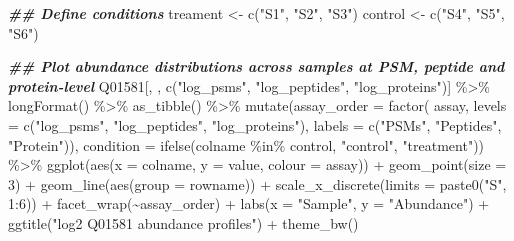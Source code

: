 \documentclass[9pt,a4paper,]{extarticle}
\newenvironment{Shaded}{\begin{snugshade}}{\end{snugshade}}
\newcommand{\AttributeTok}[1]{\textcolor[rgb]{0.77,0.63,0.00}{#1}}
\newcommand{\DecValTok}[1]{\textcolor[rgb]{0.00,0.00,0.81}{#1}}
\newcommand{\DocumentationTok}[1]{\textcolor[rgb]{0.56,0.35,0.01}{\textbf{\textit{#1}}}}
\newcommand{\FunctionTok}[1]{\textcolor[rgb]{0.00,0.00,0.00}{#1}}
\newcommand{\NormalTok}[1]{#1}
\newcommand{\OtherTok}[1]{\textcolor[rgb]{0.56,0.35,0.01}{#1}}
\newcommand{\SpecialCharTok}[1]{\textcolor[rgb]{0.00,0.00,0.00}{#1}}
\newcommand{\StringTok}[1]{\textcolor[rgb]{0.31,0.60,0.02}{#1}}
\begin{document}
\begin{Shaded}
\begin{Highlighting}[]
\DocumentationTok{\#\# Define conditions}
\NormalTok{treament }\OtherTok{\textless{}{-}} \FunctionTok{c}\NormalTok{(}\StringTok{"S1"}\NormalTok{, }\StringTok{"S2"}\NormalTok{, }\StringTok{"S3"}\NormalTok{)}
\NormalTok{control }\OtherTok{\textless{}{-}} \FunctionTok{c}\NormalTok{(}\StringTok{"S4"}\NormalTok{, }\StringTok{"S5"}\NormalTok{, }\StringTok{"S6"}\NormalTok{)}

\DocumentationTok{\#\# Plot abundance distributions across samples at PSM, peptide and protein{-}level}
\NormalTok{Q01581[, , }\FunctionTok{c}\NormalTok{(}\StringTok{"log\_psms"}\NormalTok{, }\StringTok{"log\_peptides"}\NormalTok{, }\StringTok{"log\_proteins"}\NormalTok{)] }\SpecialCharTok{\%\textgreater{}\%}
  \FunctionTok{longFormat}\NormalTok{() }\SpecialCharTok{\%\textgreater{}\%}
  \FunctionTok{as\_tibble}\NormalTok{() }\SpecialCharTok{\%\textgreater{}\%}
  \FunctionTok{mutate}\NormalTok{(}\AttributeTok{assay\_order =} \FunctionTok{factor}\NormalTok{(}
\NormalTok{    assay,}
    \AttributeTok{levels =} \FunctionTok{c}\NormalTok{(}\StringTok{"log\_psms"}\NormalTok{, }\StringTok{"log\_peptides"}\NormalTok{, }\StringTok{"log\_proteins"}\NormalTok{),}
    \AttributeTok{labels =} \FunctionTok{c}\NormalTok{(}\StringTok{"PSMs"}\NormalTok{, }\StringTok{"Peptides"}\NormalTok{, }\StringTok{"Protein"}\NormalTok{)),}
    \AttributeTok{condition =} \FunctionTok{ifelse}\NormalTok{(colname }\SpecialCharTok{\%in\%}\NormalTok{ control, }\StringTok{"control"}\NormalTok{, }\StringTok{"treatment"}\NormalTok{)) }\SpecialCharTok{\%\textgreater{}\%}
  \FunctionTok{ggplot}\NormalTok{(}\FunctionTok{aes}\NormalTok{(}\AttributeTok{x =}\NormalTok{ colname, }\AttributeTok{y =}\NormalTok{ value, }\AttributeTok{colour =}\NormalTok{ assay)) }\SpecialCharTok{+}
  \FunctionTok{geom\_point}\NormalTok{(}\AttributeTok{size =} \DecValTok{3}\NormalTok{) }\SpecialCharTok{+}
  \FunctionTok{geom\_line}\NormalTok{(}\FunctionTok{aes}\NormalTok{(}\AttributeTok{group =}\NormalTok{ rowname)) }\SpecialCharTok{+}
  \FunctionTok{scale\_x\_discrete}\NormalTok{(}\AttributeTok{limits =} \FunctionTok{paste0}\NormalTok{(}\StringTok{"S"}\NormalTok{, }\DecValTok{1}\SpecialCharTok{:}\DecValTok{6}\NormalTok{)) }\SpecialCharTok{+}
  \FunctionTok{facet\_wrap}\NormalTok{(}\SpecialCharTok{\textasciitilde{}}\NormalTok{assay\_order) }\SpecialCharTok{+}
  \FunctionTok{labs}\NormalTok{(}\AttributeTok{x =} \StringTok{"Sample"}\NormalTok{, }\AttributeTok{y =} \StringTok{"Abundance"}\NormalTok{) }\SpecialCharTok{+}
  \FunctionTok{ggtitle}\NormalTok{(}\StringTok{"log2 Q01581 abundance profiles"}\NormalTok{) }\SpecialCharTok{+}
  \FunctionTok{theme\_bw}\NormalTok{()}
\end{Highlighting}
\end{Shaded}
\end{document}
